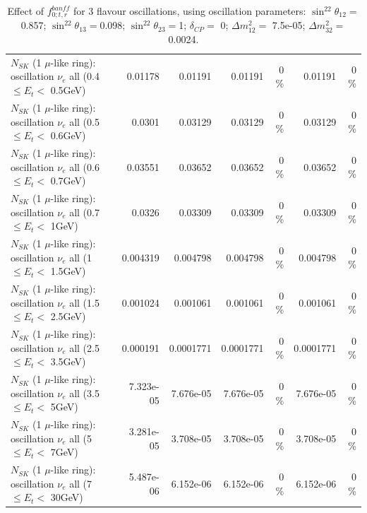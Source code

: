 \begin{table}
\begin{tabular}{| l | r | r | r  r | r  r |}
$N_{SK}$ (1 $\mu$-like ring): oscillation $\nu_{e}$ all (0.4 $\leq E_{t} <$ 0.5GeV) &         0.01178 &         0.01191 &         0.01191 &        0 \%  &         0.01191 &        0 \%  \\ 
$N_{SK}$ (1 $\mu$-like ring): oscillation $\nu_{e}$ all (0.5 $\leq E_{t} <$ 0.6GeV) &          0.0301 &         0.03129 &         0.03129 &        0 \%  &         0.03129 &        0 \%  \\ 
$N_{SK}$ (1 $\mu$-like ring): oscillation $\nu_{e}$ all (0.6 $\leq E_{t} <$ 0.7GeV) &         0.03551 &         0.03652 &         0.03652 &        0 \%  &         0.03652 &        0 \%  \\ 
$N_{SK}$ (1 $\mu$-like ring): oscillation $\nu_{e}$ all (0.7 $\leq E_{t} <$ 1GeV) &          0.0326 &         0.03309 &         0.03309 &        0 \%  &         0.03309 &        0 \%  \\ 
$N_{SK}$ (1 $\mu$-like ring): oscillation $\nu_{e}$ all (1 $\leq E_{t} <$ 1.5GeV) &        0.004319 &        0.004798 &        0.004798 &        0 \%  &        0.004798 &        0 \%  \\ 
$N_{SK}$ (1 $\mu$-like ring): oscillation $\nu_{e}$ all (1.5 $\leq E_{t} <$ 2.5GeV) &        0.001024 &        0.001061 &        0.001061 &        0 \%  &        0.001061 &        0 \%  \\ 
$N_{SK}$ (1 $\mu$-like ring): oscillation $\nu_{e}$ all (2.5 $\leq E_{t} <$ 3.5GeV) &        0.000191 &       0.0001771 &       0.0001771 &        0 \%  &       0.0001771 &        0 \%  \\ 
$N_{SK}$ (1 $\mu$-like ring): oscillation $\nu_{e}$ all (3.5 $\leq E_{t} <$ 5GeV) &       7.323e-05 &       7.676e-05 &       7.676e-05 &        0 \%  &       7.676e-05 &        0 \%  \\ 
 $N_{SK}$ (1 $\mu$-like ring): oscillation $\nu_{e}$ all (5 $\leq E_{t} <$ 7GeV) &       3.281e-05 &       3.708e-05 &       3.708e-05 &        0 \%  &       3.708e-05 &        0 \%  \\ 
$N_{SK}$ (1 $\mu$-like ring): oscillation $\nu_{e}$ all (7 $\leq E_{t} <$ 30GeV) &       5.487e-06 &       6.152e-06 &       6.152e-06 &        0 \%  &       6.152e-06 &        0 \%  \\ 
\hline
\hline
\end{tabular}
\caption{ Effect of $f_{0; t, r}^{banff}$ for 3 flavour oscillations, using oscillation parameters:  $\sin^22\theta_{12} = $0.857; $\sin^22\theta_{13} = $0.098; $\sin^22\theta_{23} = $1; $\delta_{CP} = $        0; $\Delta m^2_{12} = $    7.5e-05; $\Delta m^2_{32} = $    0.0024. }
\label{tab:num_banff_00_1RmuT_3f_osc_t13:0.098}
\end{table}

